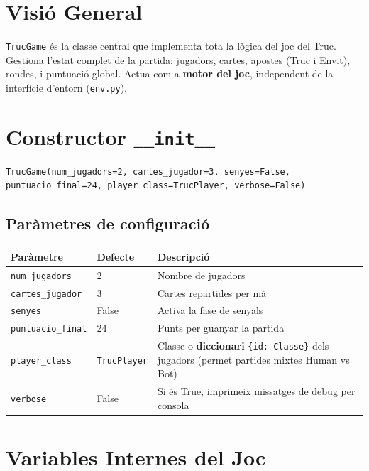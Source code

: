 \documentclass[a4paper,11pt]{report}
\begin{document}
\section{Visió General}

\texttt{TrucGame} és la classe central que implementa tota la lògica del joc del Truc. Gestiona l'estat complet de la partida: jugadors, cartes, apostes (Truc i Envit), rondes, i puntuació global. Actua com a \textbf{motor del joc}, independent de la interfície d'entorn (\texttt{env.py}).

\section{Constructor \texttt{\_\_init\_\_}}

\begin{lstlisting}
TrucGame(num_jugadors=2, cartes_jugador=3, senyes=False, puntuacio_final=24, player_class=TrucPlayer, verbose=False)
\end{lstlisting}

\subsection{Paràmetres de configuració}

\begin{longtable}{|l|l|p{6cm}|}
\hline
\textbf{Paràmetre} & \textbf{Defecte} & \textbf{Descripció} \\
\hline
\texttt{num\_jugadors} & 2 & Nombre de jugadors \\
\texttt{cartes\_jugador} & 3 & Cartes repartides per mà \\
\texttt{senyes} & False & Activa la fase de senyals \\
\texttt{puntuacio\_final} & 24 & Punts per guanyar la partida \\
\texttt{player\_class} & \texttt{TrucPlayer} & Classe o \textbf{diccionari} \texttt{\{id: Classe\}} dels jugadors (permet partides mixtes Human vs Bot) \\
\texttt{verbose} & False & Si és True, imprimeix missatges de debug per consola \\
\hline
\end{longtable}

\hrulefill

\section{Variables Internes del Joc}
\end{document}
